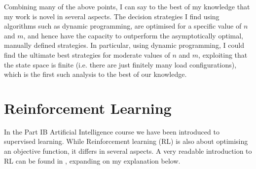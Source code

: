 \begin{itemize}

\end{itemize}


Combining many of the above points, I can say to the best of my knowledge that my work is novel in several aspects. The decision strategies I find using algorithms such as dynamic programming, are optimised for a specific value of $n$ and $m$, and hence have the capacity to outperform the asymptotically optimal, manually defined strategies. In particular, using dynamic programming, I could find the ultimate best strategies for moderate values of $n$ and $m$, exploiting that the state space is finite (i.e. there are just finitely many load configurations), which is the first such analysis to the best of our knowledge.


\section{Reinforcement Learning}


In the Part IB Artificial Intelligence course we have been introduced to supervised learning. While Reinforcement learning (RL) is also about optimising an objective function, it differs in several aspects. A very readable introduction to RL can be found in \cite{sutton2018RLbook}, expanding on my explanation below.


